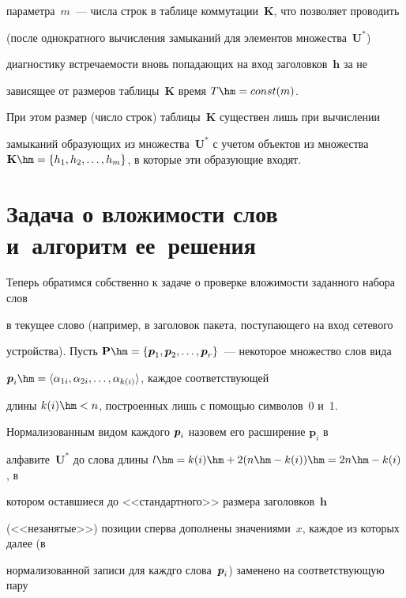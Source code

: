 параметра~$m$~--- числа строк в таблице коммутации~$\mathbf{K}$, что позволяет проводить 

(после однократного вычисления замыканий для элементов множества~$\mathbf{U}^*$) 

диагностику встречаемости вновь попадающих на вход заголовков~$\mathbf{h}$ за не 

зависящее от размеров таб\-ли\-цы~$\mathbf{K}$ время $T\hm = const (m)$.

     

     При этом размер (число строк) таблицы~$\mathbf{K}$ существен лишь при вычислении 

замыканий образующих из множества~$\mathbf{U}^*$ с учетом объектов из множества $\mathbf{K}\hm = 

\{h_1, h_2, \ldots , h_m\}$, в которые эти образующие входят.

     



\section{Задача о вложимости слов и~алгоритм ее~решения}



     Теперь обратимся собственно к задаче о проверке вложимости заданного набора слов 

в текущее слово (например, в заголовок пакета, поступающего на вход сетевого 

устройства). Пусть $\mathbf{P}\hm = \{\mbox{\bip}_1, \mbox{\bip}_2, \ldots , \mbox{\bip}_r\}$~--- некоторое множество слов вида 

$\mbox{\bip}_i \hm= \langle \alpha_{1i}, \alpha_{2i}, \ldots , \alpha_{k(i)}\rangle$, каждое соответствующей 

длины $k(i) \hm< n$, построенных лишь с помощью символов~0 и~1.

     

    Нормализованным видом каждого $\mbox{{\boldmath${p}$}}_i$ назовем его расширение $\mathbf{p}_i$ в 

алфавите~$\mathbf{U}^*$ до слова длины $l \hm= k(i) \hm+ 2(n \hm- k(i)) \hm= 2n \hm- k(i)$, в 

котором оставшиеся до <<стандартного>> размера заголовков~$\mathbf{h}$ 

(<<незанятые>>) позиции сперва дополнены значениями~$x$, каждое из которых далее (в 

нормализованной записи для каждго слова~$\mbox{{\boldmath${p}$}}_i$) заменено на соответствующую пару 

